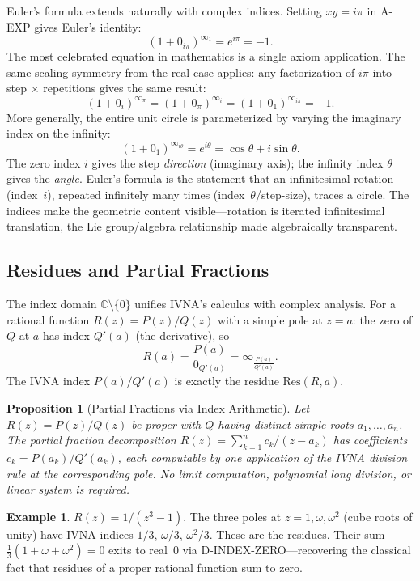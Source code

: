 \documentclass[12pt]{article}
\newtheorem{proposition}[theorem]{Proposition}
\theoremstyle{definition}
\newtheorem{example}[theorem]{Example}
\theoremstyle{remark}
\newcommand{\vz}[1]{0_{#1}}             %
\newcommand{\vi}[1]{\infty_{#1}}        %
\newcommand{\C}{\mathbb{C}}
\begin{document}
Euler's formula extends naturally with complex indices. Setting
$xy = i\pi$ in A-EXP gives Euler's identity:
\[
(1 + \vz{i\pi})^{\vi{1}} = e^{i\pi} = -1.
\]
The most celebrated equation in mathematics is a single axiom
application. The same scaling symmetry from the real case applies:
any factorization of $i\pi$ into step $\times$ repetitions gives
the same result:
\[
(1 + \vz{i})^{\vi{\pi}} = (1 + \vz{\pi})^{\vi{i}}
= (1 + \vz{1})^{\vi{i\pi}} = -1.
\]
More generally, the entire unit circle is parameterized by varying
the imaginary index on the infinity:
\[
(1 + \vz{1})^{\vi{i\theta}} = e^{i\theta}
= \cos\theta + i\sin\theta.
\]
The zero index $i$ gives the step \emph{direction} (imaginary axis);
the infinity index $\theta$ gives the \emph{angle}. Euler's formula
is the statement that an infinitesimal rotation (index~$i$), repeated
infinitely many times (index~$\theta$/step-size), traces a circle. The
indices make the geometric content visible---rotation is iterated
infinitesimal translation, the Lie group/algebra relationship made
algebraically transparent.

\subsection{Residues and Partial Fractions}

The index domain $\C \setminus \{0\}$ unifies IVNA's calculus with
complex analysis. For a rational function $R(z) = P(z)/Q(z)$ with a
simple pole at $z = a$: the zero of $Q$ at $a$ has index $Q'(a)$
(the derivative), so
\[
R(a) = \frac{P(a)}{\vz{Q'(a)}} = \vi{\frac{P(a)}{Q'(a)}}.
\]
The IVNA index $P(a)/Q'(a)$ is exactly the residue $\mathrm{Res}(R, a)$.

\begin{proposition}[Partial Fractions via Index Arithmetic]
\label{prop:partial}
Let $R(z) = P(z)/Q(z)$ be proper with $Q$ having distinct simple
roots $a_1, \ldots, a_n$. The partial fraction decomposition
$R(z) = \sum_{k=1}^n c_k/(z - a_k)$ has coefficients
$c_k = P(a_k)/Q'(a_k)$, each computable by one application of the
IVNA division rule at the corresponding pole. No limit computation,
polynomial long division, or linear system is required.
\end{proposition}

\begin{example}
$R(z) = 1/(z^3 - 1)$. The three poles at $z = 1, \omega, \omega^2$
(cube roots of unity) have IVNA indices
$1/3$, $\omega/3$, $\omega^2/3$. These are the residues. Their sum
$\tfrac{1}{3}(1 + \omega + \omega^2) = 0$ exits to real~$0$ via
D-INDEX-ZERO---recovering the classical fact that residues of a
proper rational function sum to zero.
\end{example}
\end{document}
